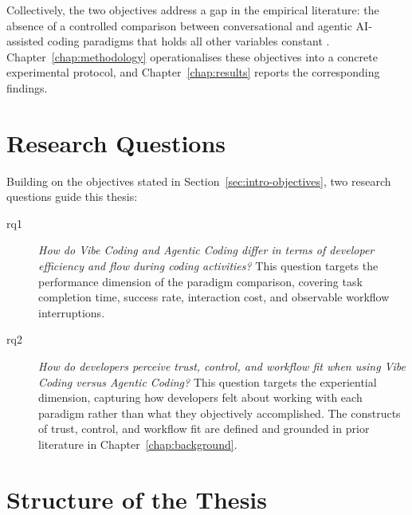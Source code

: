 Collectively, the two objectives address a gap in the empirical literature: the absence of a controlled comparison between conversational and agentic AI-assisted coding paradigms that holds all other variables constant \parencite{sarkar2025codewithme, wohlin2012experimentation}. Chapter~\ref{chap:methodology} operationalises these objectives into a concrete experimental protocol, and Chapter~\ref{chap:results} reports the corresponding findings.
\section{Research Questions}

\label{sec:intro-rqs}
Building on the objectives stated in Section~\ref{sec:intro-objectives}, two research questions guide this thesis:
\begin{description}

  \item[\gls{rq1}] \emph{How do Vibe Coding and Agentic Coding differ in terms of developer efficiency and flow during coding activities?}
    This question targets the performance dimension of the paradigm comparison, covering task completion time, success rate, interaction cost, and observable workflow interruptions.

  \item[\gls{rq2}] \emph{How do developers perceive trust, control, and workflow fit when using Vibe Coding versus Agentic Coding?}
    This question targets the experiential dimension, capturing how developers felt about working with each paradigm rather than what they objectively accomplished. The constructs of trust, control, and workflow fit are defined and grounded in prior literature in Chapter~\ref{chap:background}.

\end{description}

\section{Structure of the Thesis}

\label{sec:intro-structure}

